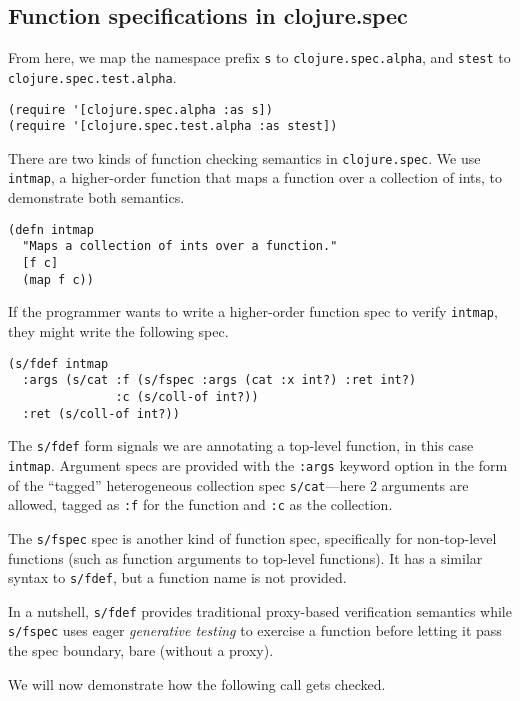 \subsection{Function specifications in clojure.spec}

From here, we map the namespace prefix \texttt{s} to \texttt{clojure.spec.alpha},
and \texttt{stest} to \texttt{clojure.spec.test.alpha}.

\begin{verbatim}
(require '[clojure.spec.alpha :as s])
(require '[clojure.spec.test.alpha :as stest])
\end{verbatim}

There are two kinds of function checking semantics in \texttt{clojure.spec}.
We use \texttt{intmap}, a higher-order function that maps a function over 
a collection of ints, to demonstrate both semantics.

\begin{verbatim}
(defn intmap
  "Maps a collection of ints over a function."
  [f c]
  (map f c))
\end{verbatim}

If the programmer wants to write a higher-order function spec to
verify \texttt{intmap}, they might write the following spec.

\begin{verbatim}
(s/fdef intmap
  :args (s/cat :f (s/fspec :args (cat :x int?) :ret int?)
               :c (s/coll-of int?))
  :ret (s/coll-of int?))
\end{verbatim}

The \texttt{s/fdef} form signals we are annotating a top-level
function, in this case \texttt{intmap}. Argument specs are
provided with the \texttt{:args} keyword option
in the form of the ``tagged'' heterogeneous collection spec
\texttt{s/cat}---here 2 arguments are allowed, tagged as
\texttt{:f} for the function and \texttt{:c} as the collection.

The \texttt{s/fspec} spec is another kind of function spec,
specifically for non-top-level functions (such as function arguments
to top-level functions). It has a similar syntax to \texttt{s/fdef},
but a function name is not provided.

In a nutshell, \texttt{s/fdef} provides traditional proxy-based
verification semantics while \texttt{s/fspec} uses eager \emph{generative testing}
to exercise a function before letting it pass the spec boundary, bare (without a proxy).

We will now demonstrate how the following call gets checked.

